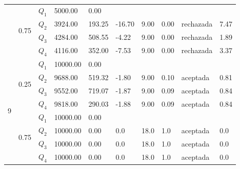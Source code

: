 \begin{table}[]
\begin{tabular}{|l|l|l|l|l|l|l|l|l|l|}
 & \multirow{4}{*}{0.75} & $Q_1$ & 5000.00 & 0.00 & \multicolumn{5}{l|}{} \\ \cline{3-10} 
 &  & $Q_2$ & 3924.00 & 193.25 & -16.70 & 9.00 & 0.00 & rechazada & 7.47 \\ \cline{3-10} 
 &  & $Q_3$ & 4284.00 & 508.55 & -4.22 & 9.00 & 0.00 & rechazada & 1.89 \\ \cline{3-10} 
 &  & $Q_4$ & 4116.00 & 352.00 & -7.53 & 9.00 & 0.00 & rechazada & 3.37 \\ \hline
\multirow{8}{*}{9} & \multirow{4}{*}{0.25} & $Q_1$ & 10000.00 & 0.00 & \multicolumn{5}{l|}{} \\ \cline{3-10} 
 &  & $Q_2$ & 9688.00 & 519.32 & -1.80 & 9.00 & 0.10 & aceptada & 0.81 \\ \cline{3-10} 
 &  & $Q_3$ & 9552.00 & 719.07 & -1.87 & 9.00 & 0.09 & aceptada & 0.84 \\ \cline{3-10} 
 &  & $Q_4$ & 9818.00 & 290.03 & -1.88 & 9.00 & 0.09 & aceptada & 0.84 \\ \cline{2-10} 
 & \multirow{4}{*}{0.75} & $Q_1$ & 10000.00 & 0.00 & \multicolumn{5}{l|}{} \\ \cline{3-10} 
 &  & $Q_2$ & 10000.00 & 0.00 & 0.0 & 18.0 & 1.0 & aceptada & 0.0 \\ \cline{3-10} 
 &  & $Q_3$ & 10000.00 & 0.00 & 0.0 & 18.0 & 1.0 & aceptada & 0.0 \\ \cline{3-10} 
 &  & $Q_4$ & 10000.00 & 0.00 & 0.0 & 18.0 & 1.0 & aceptada & 0.0 \\ \hline
\end{tabular}
\end{table}

\clearpage

